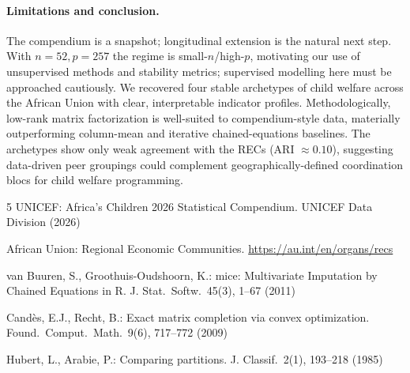\documentclass[runningheads]{llncs}
\begin{document}
\paragraph{Limitations and conclusion.} The compendium is a snapshot; longitudinal extension is the natural next step. With $n{=}52, p{=}257$ the regime is small-$n$/high-$p$, motivating our use of unsupervised methods and stability metrics; supervised modelling here must be approached cautiously. We recovered four stable archetypes of child welfare across the African Union with clear, interpretable indicator profiles. Methodologically, low-rank matrix factorization is well-suited to compendium-style data, materially outperforming column-mean and iterative chained-equations baselines. The archetypes show only weak agreement with the RECs (ARI $\approx 0.10$), suggesting data-driven peer groupings could complement geographically-defined coordination blocs for child welfare programming.

\begin{thebibliography}{5}\small
{}
UNICEF: Africa's Children 2026 Statistical Compendium. UNICEF Data Division (2026)

African Union: Regional Economic Communities. \url{https://au.int/en/organs/recs}

van Buuren, S., Groothuis-Oudshoorn, K.: mice: Multivariate Imputation by Chained Equations in R. J. Stat.\ Softw.\ 45(3), 1--67 (2011)

Cand\`es, E.J., Recht, B.: Exact matrix completion via convex optimization. Found.\ Comput.\ Math.\ 9(6), 717--772 (2009)

Hubert, L., Arabie, P.: Comparing partitions. J. Classif.\ 2(1), 193--218 (1985)
\end{thebibliography}
\end{document}
